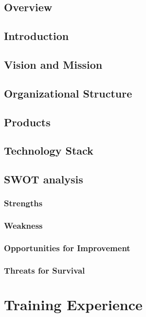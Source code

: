 \documentclass[12pt,a4paper]{report}
\begin{document}
\section{Overview}


\section{Introduction}


\section{Vision and Mission}


\section{Organizational Structure}


\section{Products}


\section{Technology Stack}


\section{SWOT analysis}


\subsection{Strengths}


\subsection{Weakness}

\subsection{Opportunities for Improvement}

\subsection{Threats for Survival}

\chapter{Training Experience}
\end{document}
